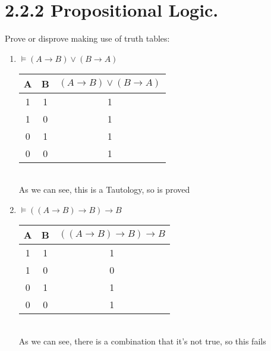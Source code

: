 \documentclass{article}
\begin{document}
\section*{2.2.2 Propositional Logic.}
Prove or disprove making use of truth tables:
\begin{enumerate}
    \item $\models (A \rightarrow B) \vee (B \rightarrow A)$
    \begin{table}[h!]
        \centering
        \begin{tabular}{|c|c|c|}
            \hline
            \textbf{A} & \textbf{B} & \textbf{$(A \rightarrow B) \vee (B \rightarrow A)$}\\
            \hline
            1 & 1 & 1 \\
            \hline
            1 & 0 & 1 \\
            \hline
            0 & 1 & 1 \\
            \hline
            0 & 0 & 1 \\
            \hline
        \end{tabular}
    \end{table}
    \\As we can see, this is a Tautology, so is proved

    \item $\models ((A \rightarrow B) \rightarrow B) \rightarrow B$
    \begin{table}[h!]
        \centering
        \begin{tabular}{|c|c|c|}
            \hline
            \textbf{A} & \textbf{B} & \textbf{$((A \rightarrow B) \rightarrow B) \rightarrow B$}\\
            \hline
            1 & 1 & 1 \\
            \hline
            1 & 0 & 0 \\
            \hline
            0 & 1 & 1 \\
            \hline
            0 & 0 & 1 \\
            \hline
        \end{tabular}
    \end{table}
    \\As we can see, there is a combination that it's not true, so this fails


\end{enumerate}
\end{document}

